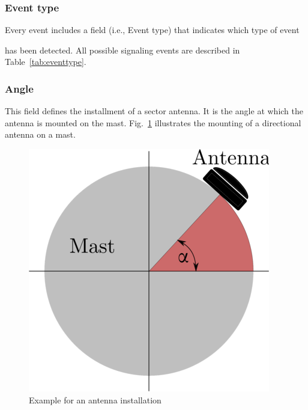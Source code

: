 \documentclass[master,english]{hgbthesis}
\begin{document}
\subsubsection{Event type}

Every event includes a field (i.e., Event type) that indicates which type of event

has been detected. All possible signaling events are described in Table~\ref{tab:eventtype}.

\subsubsection{Angle}

This field defines the installment of a sector antenna. It is the angle at which the antenna is mounted on the mast. Fig.~\ref{fig:antennaangle} illustrates the mounting of a directional antenna on a mast.




% 




\begin{figure}

	\centering

	\includegraphics[width=0.4\linewidth]{./images/antennaangle.png}

	\caption{Example for an antenna installation} 

	\label{fig:antennaangle}

\end{figure}
\end{document}
